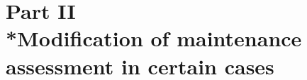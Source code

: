 \documentclass[a4paper]{article}
\begin{document}
%
%
%
%
%
%
%
%

\section[Part II --- Modification of maintenance assessment in certain cases]{Part II\\*Modification of maintenance assessment in certain cases}
\end{document}
